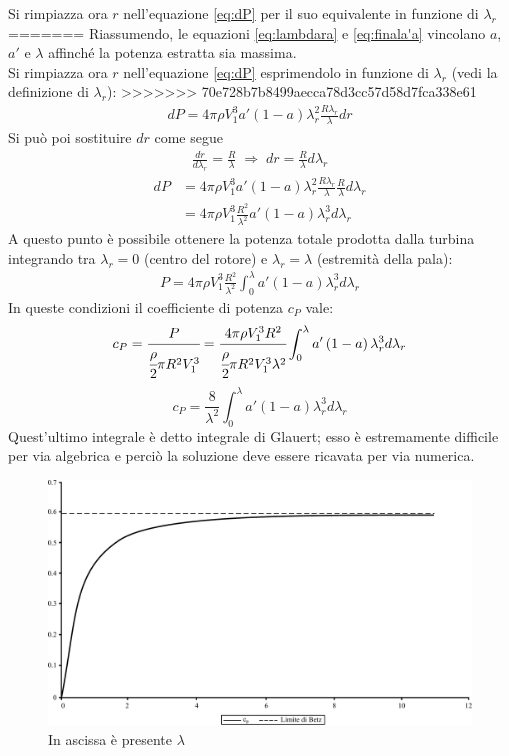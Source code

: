 Si rimpiazza ora $r$ nell'equazione \ref{eq:dP} per il suo equivalente in funzione di $\lambda_r$
=======
Riassumendo, le equazioni \ref{eq:lambdara} e \ref{eq:finala'a} vincolano $a$, $a'$ e $\lambda$ affinché la potenza estratta sia massima.\\
Si rimpiazza ora $r$ nell'equazione \ref{eq:dP} esprimendolo in funzione di $\lambda_r$ (vedi la definizione di $\lambda_r$):
>>>>>>> 70e728b7b8499aecca78d3cc57d58d7fca338e61
\begin{align*}
dP = 4 \pi \rho V_1^3 a' \left( 1 - a \right) \lambda_r^2 \frac{R \lambda_r}{\lambda} dr
\end{align*}
Si può poi sostituire $dr$ come segue
\begin{align*}
\frac{dr}{d \lambda_r} = \frac{R}{\lambda} \; \Rightarrow \; dr = \frac{R}{\lambda} d \lambda_r
\end{align*}
\begin{align*}
dP &= 4 \pi \rho V_1^3 a' \left(1 - a \right) \lambda_r^2 \frac{R \lambda_r}{\lambda} \frac{R}{\lambda} d \lambda_r\\
&= 4 \pi \rho V_1^3 \frac{R^2}{\lambda^2} a' \left( 1 - a \right) \lambda_r^3 d\lambda_r
\end{align*}
A questo punto è possibile ottenere la potenza totale prodotta dalla turbina integrando tra $\lambda_r = 0$ (centro del rotore) e $\lambda_r = \lambda$ (estremità della pala):
\begin{align*}
P = 4 \pi \rho V_1^3 \frac{R^2}{\lambda^2} \int_0^{\lambda} a' \left( 1 - a \right) \lambda_r^3 d \lambda_r
\end{align*}
In queste condizioni il coefficiente di potenza $c_P$ vale:
\begin{align*}
c_P = \cfrac{P}{\cfrac{\rho}{2} \pi R^2 V_1^3} = \cfrac{4 \pi \rho V_1^3 R^2}{\cfrac{\rho}{2} \pi R^2  V_1^3 \lambda^2} \int_0^{\lambda} a' \left(1 - a \right) \lambda_r^3 d \lambda_r
\end{align*}
\begin{equation}
c_P = \frac{8}{\lambda^2} \int_0^{\lambda} a' \left( 1 - a \right) \lambda_r^3 d \lambda_r
\end{equation}
Quest'ultimo integrale è detto integrale di Glauert; esso è estremamente difficile per via algebrica e perciò la soluzione deve essere ricavata per via numerica.
\begin{figure}[h!]
\centering
  \includegraphics[width=.7\textwidth]{fig/limBetz.pdf}
\caption{In ascissa è presente $\lambda$}
\label{fig:limBetz}
\end{figure}
